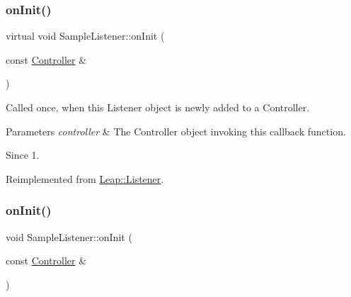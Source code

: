 \mbox{\label{class_sample_listener_ab2a418fbd9bd0da82f47e0e9b3149b38}} 
\subsubsection{\texorpdfstring{on\+Init()}{onInit()}\hspace{0.1cm}{\footnotesize\ttfamily [1/2]}}
{\footnotesize\ttfamily virtual void Sample\+Listener\+::on\+Init (\begin{DoxyParamCaption}\item[{const \hyperlink{class_leap_1_1_controller}{Controller} \&}]{ }\end{DoxyParamCaption})\hspace{0.3cm}{\ttfamily [virtual]}}

Called once, when this Listener object is newly added to a Controller.


\begin{DoxyCodeInclude}
\end{DoxyCodeInclude}



\begin{DoxyParams}{Parameters}
{\em controller} & The Controller object invoking this callback function. \\
\hline
\end{DoxyParams}
\begin{DoxySince}{Since}
1. 
\end{DoxySince}


Reimplemented from \hyperlink{class_leap_1_1_listener_a180d621ad08afa5851d03d3546a82bbf}{Leap\+::\+Listener}.

\mbox{\label{class_sample_listener_a8e28c251385c39ebd874f48396da7fb6}} 
\subsubsection{\texorpdfstring{on\+Init()}{onInit()}\hspace{0.1cm}{\footnotesize\ttfamily [2/2]}}
{\footnotesize\ttfamily void Sample\+Listener\+::on\+Init (\begin{DoxyParamCaption}\item[{const \hyperlink{class_leap_1_1_controller}{Controller} \&}]{ }\end{DoxyParamCaption})\hspace{0.3cm}{\ttfamily [virtual]}}

